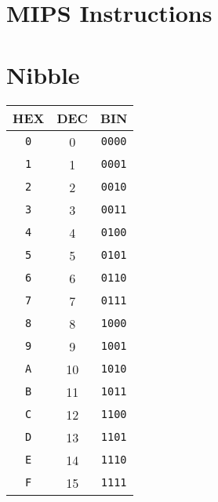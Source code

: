\documentclass{article}
\begin{document}
\thispagestyle{empty}


\begin{minipage}[t][\textheight-1ex][t]{0.38\linewidth}
    \section*{MIPS Instructions}
    
\end{minipage}
\hfill
\begin{minipage}[t][\textheight-1ex][t]{0.2\linewidth}
    \section*{Nibble}
    \centering
    \begin{tabular}{ccc}
        \toprule
        HEX        & DEC & BIN           \\
        \midrule
        \texttt{0} & 0   & \texttt{0000} \\
        \texttt{1} & 1   & \texttt{0001} \\
        \texttt{2} & 2   & \texttt{0010} \\
        \texttt{3} & 3   & \texttt{0011} \\
        \texttt{4} & 4   & \texttt{0100} \\
        \texttt{5} & 5   & \texttt{0101} \\
        \texttt{6} & 6   & \texttt{0110} \\
        \texttt{7} & 7   & \texttt{0111} \\
        \texttt{8} & 8   & \texttt{1000} \\
        \texttt{9} & 9   & \texttt{1001} \\
        \texttt{A} & 10  & \texttt{1010} \\
        \texttt{B} & 11  & \texttt{1011} \\
        \texttt{C} & 12  & \texttt{1100} \\
        \texttt{D} & 13  & \texttt{1101} \\
        \texttt{E} & 14  & \texttt{1110} \\
        \texttt{F} & 15  & \texttt{1111} \\
        \bottomrule
    \end{tabular}
\end{minipage}
\hfill
\end{document}
